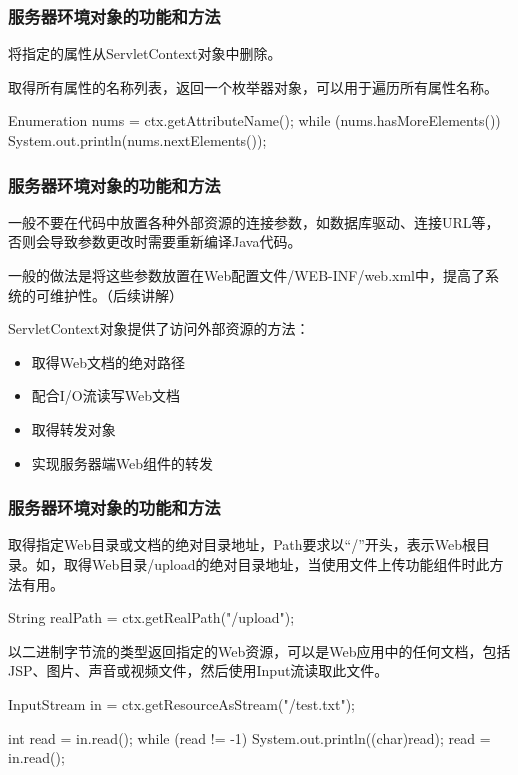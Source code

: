 \begin{frame}[fragile] %
\frametitle{服务器环境对象的功能和方法} 


将指定的属性从ServletContext对象中删除。


取得所有属性的名称列表，返回一个枚举器对象，可以用于遍历所有属性名称。
\begin{javaCode}
Enumeration nums = ctx.getAttributeName();
while (nums.hasMoreElements()) {
  System.out.println(nums.nextElements());
}
\end{javaCode}
\end{frame}

\begin{frame}[fragile] %
\frametitle{服务器环境对象的功能和方法} 


一般不要在代码中放置各种外部资源的连接参数，如数据库驱动、连接URL等，否则会导致参数更改时需要重新编译Java代码。

一般的做法是将这些参数放置在Web配置文件/WEB-INF/web.xml中，提高了系统的可维护性。（后续讲解）


ServletContext对象提供了访问外部资源的方法：
\begin{itemize}
\item 取得Web文档的绝对路径
\item 配合I/O流读写Web文档
\item 取得转发对象
\item 实现服务器端Web组件的转发
\end{itemize}

\end{frame}

\begin{frame}[fragile] %
\frametitle{服务器环境对象的功能和方法} 


取得指定Web目录或文档的绝对目录地址，Path要求以“/”开头，表示Web根目录。如，取得Web目录/upload的绝对目录地址，当使用文件上传功能组件时此方法有用。

\begin{javaCode}
String realPath = ctx.getRealPath("/upload");
\end{javaCode}


以二进制字节流的类型返回指定的Web资源，可以是Web应用中的任何文档，包括JSP、图片、声音或视频文件，然后使用Input流读取此文件。
\begin{javaCode}
InputStream in = ctx.getResourceAsStream("/test.txt");

int read = in.read();
while (read != -1) {
  System.out.println((char)read);
  read = in.read();
}  
\end{javaCode}
\end{frame}

